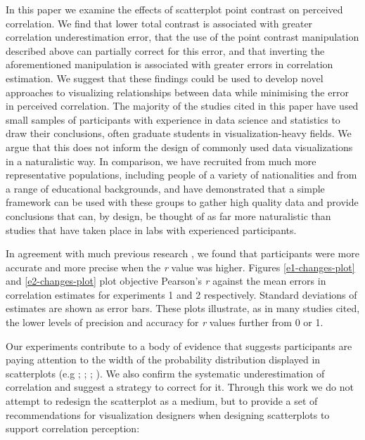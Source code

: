 \documentclass[preprint, 3p,
authoryear]{elsarticle} %
\begin{document}
In this paper we examine the effects of scatterplot point contrast on
perceived correlation. We find that lower total contrast is associated
with greater correlation underestimation error, that the use of the
point contrast manipulation described above can partially correct for
this error, and that inverting the aforementioned manipulation is
associated with greater errors in correlation estimation. We suggest
that these findings could be used to develop novel approaches to
visualizing relationships between data while minimising the error in
perceived correlation. The majority of the studies cited in this paper
have used small samples of participants with experience in data science
and statistics to draw their conclusions, often graduate students in
visualization-heavy fields. We argue that this does not inform the
design of commonly used data visualizations in a naturalistic way. In
comparison, we have recruited from much more representative populations,
including people of a variety of nationalities and from a range of
educational backgrounds, and have demonstrated that a simple framework
can be used with these groups to gather high quality data and provide
conclusions that can, by design, be thought of as far more naturalistic
than studies that have taken place in labs with experienced
participants.

In agreement with much previous research
\citep{rensink_2010, rensink_2012, rensink_2014, rensink_2017, pollack_1960},
we found that participants were more accurate and more precise when the
\emph{r} value was higher. Figures \ref{e1-changes-plot} and
\ref{e2-changes-plot} plot objective Pearson's \emph{r} against the mean
errors in correlation estimates for experiments 1 and 2 respectively.
Standard deviations of estimates are shown as error bars. These plots
illustrate, as in many studies cited, the lower levels of precision and
accuracy for \emph{r} values further from 0 or 1.

Our experiments contribute to a body of evidence that suggests
participants are paying attention to the width of the probability
distribution displayed in scatterplots (e.g \citealp{cleveland_1982};
\citealp{meyer_1997}; \citealp{yang_2019}; \citealp{rensink_2017}). We
also confirm the systematic underestimation of correlation and suggest a
strategy to correct for it. Through this work we do not attempt to
redesign the scatterplot as a medium, but to provide a set of
recommendations for visualization designers when designing scatterplots
to support correlation perception:
\end{document}
